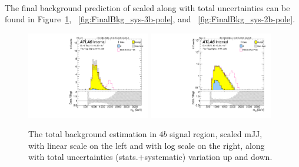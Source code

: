 \paragraph{}
The final background prediction of scaled \mtwoJ along with total uncertainties can be found in Figure~\ref{fig:FinalBkg_sys-4b-pole}, ~\ref{fig:FinalBkg_sys-3b-pole}, and ~\ref{fig:FinalBkg_sys-2b-pole}.

\begin{figure}
\begin{center}
\includegraphics[width=0.48\textwidth,angle=-90]{figures/boosted/Signal_Syst/Moriond_bkg_9_FourTag_Signal_mHH_pole_blind.pdf}
\includegraphics[width=0.48\textwidth,angle=-90]{figures/boosted/Signal_Syst/Moriond_bkg_9_FourTag_Signal_mHH_pole_1_blind.pdf}
\caption{The total background estimation in $4b$ signal region, scaled mJJ, with linear scale on the left and with log scale on the right, along with total uncertainties (stats.$+$systematic) variation up and down.}
\label{fig:FinalBkg_sys-4b-pole}
\end{center}
\end{figure}


